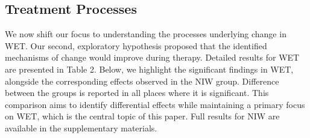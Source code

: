 \documentclass[
  man,floatsintext]{apa7}
\begin{document}
\subsection{Treatment Processes}\label{treatment-processes}

We now shift our focus to understanding the processes underlying change in WET.
Our second, exploratory hypothesis proposed that the identified mechanisms of change would improve during therapy.
Detailed results for WET are presented in Table 2.
Below, we highlight the significant findings in WET, alongside the corresponding effects observed in the NIW group.
Difference between the groups is reported in all places where it is significant.
This comparison aims to identify differential effects while maintaining a primary focus on WET, which is the central topic of this paper.
Full results for NIW are available in the supplementary materials.
\end{document}
